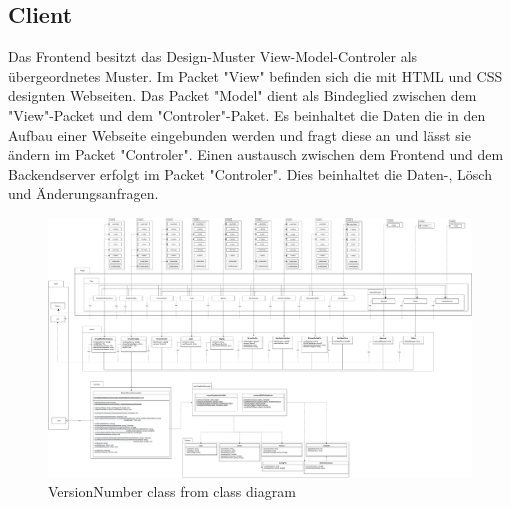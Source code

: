 \subsection{Client}
Das Frontend besitzt das Design-Muster View-Model-Controler als übergeordnetes Muster. Im Packet "View" befinden sich die mit HTML und CSS designten Webseiten. Das Packet "Model" dient als Bindeglied zwischen dem "View"-Packet und dem "Controler"-Paket. Es beinhaltet die Daten die in den Aufbau einer Webseite eingebunden werden und fragt diese an und lässt sie ändern im Packet "Controler". Einen austausch zwischen dem Frontend und dem Backendserver erfolgt im Packet "Controler". Dies beinhaltet die Daten-, Lösch und Änderungsanfragen.

\begin{figure}[H]
\centerline{\includegraphics[scale=0.2]{res/FrontendUML.drawio.pdf}}
\caption{VersionNumber class from class diagram}
\end{figure}

\newpage